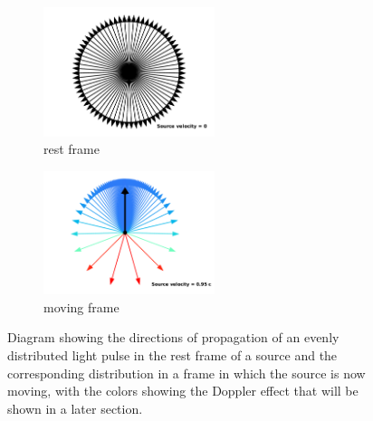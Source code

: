 \begin{figure}[ht]
	\begin{subfigure}{.49\textwidth}
		\centering
		\includegraphics[width=5cm]{images/pdf/Aberrated_velocities_restframe.pdf}
		\caption{rest frame}
	\end{subfigure}
	\begin{subfigure}{.49\textwidth}
		\centering
		\includegraphics[width=5cm]{images/pdf/Aberrated_velocities.pdf}
		\caption{moving frame}
	\end{subfigure}
	\caption{Diagram showing the directions of propagation of an evenly distributed light pulse in the rest frame of a source and the corresponding distribution in a frame in which the source is now moving, with the colors showing the Doppler effect that will be shown in a later section.}
\end{figure}

